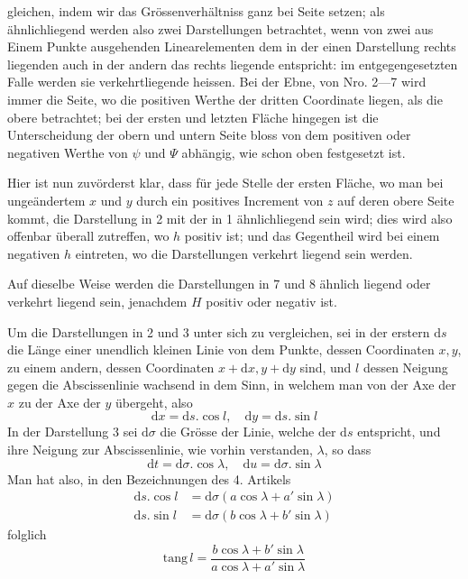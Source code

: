 %
gleichen, indem wir das Grössenverhältniss ganz bei Seite setzen; als ähnlichliegend werden also zwei Darstellungen betrachtet, wenn von zwei aus Einem Punkte ausgehenden Linearelementen dem in der einen Darstellung rechts liegenden auch in der andern das rechts liegende entspricht: im entgegengesetzten Falle werden sie verkehrtliegende heissen. Bei der Ebne, von Nro. 2---7 wird immer die Seite, wo die positiven Werthe der dritten Coordinate liegen, als die obere betrachtet; bei der ersten und letzten Fläche hingegen ist die Unterscheidung der obern und untern Seite bloss von dem positiven oder negativen Werthe von \(\psi\) und \(\Psi\) abhängig, wie schon oben festgesetzt ist.

Hier ist nun zuvörderst klar, dass für jede Stelle der ersten Fläche, wo man bei ungeändertem \(x\) und \(y\) durch ein positives Increment von \(z\) auf deren obere Seite kommt, die Darstellung in 2 mit der in 1 ähnlichliegend sein wird; dies wird also offenbar überall zutreffen, wo \(h\) positiv ist; und das Gegentheil wird bei einem negativen \(h\) eintreten, wo die Darstellungen verkehrt liegend sein werden.

Auf dieselbe Weise werden die Darstellungen in 7 und 8 ähnlich liegend oder verkehrt liegend sein, jenachdem \(H\) positiv oder negativ ist.

Um die Darstellungen in 2 und 3 unter sich zu vergleichen, sei in der erstern \(\mathrm{d}s\) die Länge einer unendlich kleinen Linie von dem Punkte, dessen Coordinaten \(x,y\), zu einem andern, dessen Coordinaten \(x+\mathrm{d}x,y+\mathrm{d}y\) sind, und \(l\) dessen Neigung gegen die Abscissenlinie wachsend in dem Sinn, in welchem man von der Axe der \(x\) zu der Axe der \(y\) übergeht, also
\[
\mathrm{d}x=\mathrm{d}s\mathord{.}\cos l,\quad \mathrm{d}y=\mathrm{d}s\mathord{.}\sin l
\]
\noindent In der Darstellung 3 sei \(\mathrm{d}\sigma\) die Grösse der Linie, welche der \(\mathrm{d}s\) entspricht, und ihre Neigung zur Abscissenlinie, wie vorhin verstanden, \(\lambda\), so dass
\[
\mathrm{d}t=\mathrm{d}\sigma\mathord{.}\cos\lambda,\quad \mathrm{d}u=\mathrm{d}\sigma\mathord{.}\sin\lambda
\]
\noindent Man hat also, in den Bezeichnungen des 4. Artikels
\[
\begin{aligned}
\mathrm{d}s\mathord{.}\cos l&=\mathrm{d}\sigma(a\cos\lambda+a'\sin\lambda)\\
\mathrm{d}s\mathord{.}\sin l&=\mathrm{d}\sigma(b\cos\lambda+b'\sin\lambda)
\end{aligned}
\]
\noindent folglich
\[
\mathrm{tang}\,l=\frac{b\cos\lambda+b'\sin\lambda}{a\cos\lambda+a'\sin\lambda}
\]
